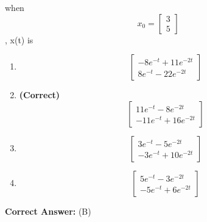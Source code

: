 \documentclass[11pt,a4paper]{article}
\begin{document}
 when  
\[
x_{0}=\begin{bmatrix} 3\\ 5 \end{bmatrix}
\]
, x(t) is


\begin{enumerate}[label=(\Alph*)]
    \item \[
\begin{bmatrix} -8e^{-t} +11e^{-2t}\\ 8e^{-t} -22e^{-2t} \end{bmatrix}
\]
    \item \textbf{(Correct)} \[
\begin{bmatrix} 11e^{-t} -8e^{-2t}\\ -11e^{-t} +16e^{-2t} \end{bmatrix}
\]
    \item \[
\begin{bmatrix} 3e^{-t} -5e^{-2t}\\ -3e^{-t} +10e^{-2t} \end{bmatrix}
\]
    \item \[
\begin{bmatrix} 5e^{-t} -3e^{-2t}\\ -5e^{-t} +6e^{-2t} \end{bmatrix}
\]
\end{enumerate}

\noindent \textbf{Correct Answer:} (B)
\end{document}
